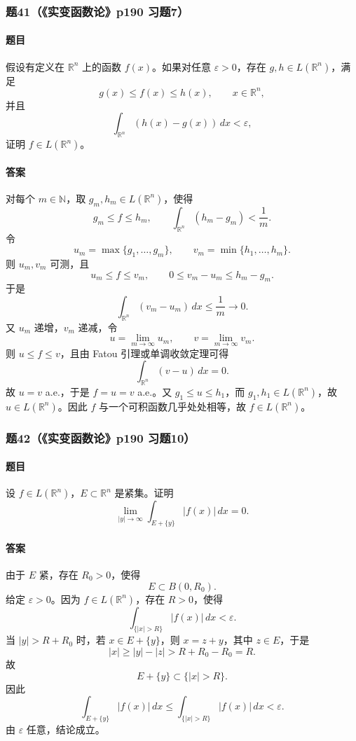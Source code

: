 \documentclass{article}
\newcommand{\R}{\mathbb{R}}
\newcommand{\N}{\mathbb{N}}
\newcommand{\eps}{\varepsilon}
\begin{document}
	\subsubsection*{题41（《实变函数论》p190 习题7）}
	\paragraph{题目}假设有定义在 $\R^n$ 上的函数 $f(x)$。如果对任意 $\eps>0$，存在 $g,h\in L(\R^n)$，满足
	\[
	g(x)\le f(x)\le h(x),
	\qquad x\in\R^n,
	\]
	并且
	\[
	\int_{\R^n}(h(x)-g(x))\,dx<\eps,
	\]
	证明 $f\in L(\R^n)$。
	
	\paragraph{答案}对每个 $m\in\N$，取 $g_m,h_m\in L(\R^n)$，使得
	\[
	g_m\le f\le h_m,
	\qquad
	\int_{\R^n}(h_m-g_m)<\frac1m.
	\]
	令
	\[
	u_m=\max\{g_1,
	\ldots,g_m\},
	\qquad
	v_m=\min\{h_1,
	\ldots,h_m\}.
	\]
	则 $u_m,v_m$ 可测，且
	\[
	u_m\le f\le v_m,
	\qquad
	0\le v_m-u_m\le h_m-g_m.
	\]
	于是
	\[
	\int_{\R^n}(v_m-u_m)\,dx\le\frac1m\to0.
	\]
	又 $u_m$ 递增，$v_m$ 递减，令
	\[
	u=\lim_{m\to\infty}u_m,
	\qquad
	v=\lim_{m\to\infty}v_m.
	\]
	则 $u\le f\le v$，且由 Fatou 引理或单调收敛定理可得
	\[
	\int_{\R^n}(v-u)\,dx=0.
	\]
	故 $u=v$ a.e.，于是 $f=u=v$ a.e.。又 $g_1\le u\le h_1$，而 $g_1,h_1\in L(\R^n)$，故 $u\in L(\R^n)$。因此 $f$ 与一个可积函数几乎处处相等，故 $f\in L(\R^n)$。
	
	\subsubsection*{题42（《实变函数论》p190 习题10）}
	\paragraph{题目}设 $f\in L(\R^n)$，$E\subset\R^n$ 是紧集。证明
	\[
	\lim_{|y|\to\infty}\int_{E+\{y\}}|f(x)|\,dx=0.
	\]
	
	\paragraph{答案}由于 $E$ 紧，存在 $R_0>0$，使得
	\[
	E\subset B(0,R_0).
	\]
	给定 $\eps>0$。因为 $f\in L(\R^n)$，存在 $R>0$，使得
	\[
	\int_{\{|x|>R\}}|f(x)|\,dx<\eps.
	\]
	当 $|y|>R+R_0$ 时，若 $x\in E+\{y\}$，则 $x=z+y$，其中 $z\in E$，于是
	\[
	|x|\ge |y|-|z|>R+R_0-R_0=R.
	\]
	故
	\[
	E+\{y\}\subset\{|x|>R\}.
	\]
	因此
	\[
	\int_{E+\{y\}}|f(x)|\,dx
	\le
	\int_{\{|x|>R\}}|f(x)|\,dx
	<\eps.
	\]
	由 $\eps$ 任意，结论成立。
	
\end{document}

